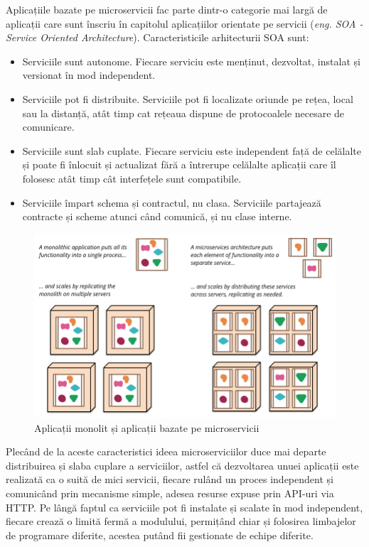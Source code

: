 \documentclass[12pt, a4paper, oneside, romanian]{teza-upb}
\begin{document}
Aplicațiile bazate pe microservicii fac parte dintr-o categorie mai largă de aplicații care sunt înscriu în capitolul aplicațiilor orientate pe servicii (\textit{eng. SOA - Service Oriented Architecture}). Caracteristicile arhitecturii SOA sunt:
\begin{itemize}
 \item Serviciile sunt autonome. Fiecare serviciu este menținut, dezvoltat, instalat și versionat în mod independent.
 \item Serviciile pot fi distribuite. Serviciile pot fi localizate oriunde pe rețea, local sau la distanță, atât timp cat rețeaua dispune de protocoalele necesare de comunicare.
 \item Serviciile sunt slab cuplate. Fiecare serviciu este independent față de celălalte și poate fi înlocuit și actualizat fără a întrerupe celălalte aplicații care îl folosesc atât timp cât interfețele sunt compatibile.
 \item Serviciile împart schema și contractul, nu clasa. Serviciile partajează contracte și scheme atunci când comunică, și nu clase interne.
\end{itemize}

\begin{figure}[ht]
\centering
\includegraphics[scale=0.3]{img/sketch.png}
\caption{Aplicații monolit și aplicații bazate pe microservicii}
\label{fig:arhi_mono_micro}
\end{figure}

Plecând de la aceste caracteristici ideea microserviciilor duce mai departe distribuirea și slaba cuplare a serviciilor, astfel că dezvoltarea unuei aplicații este realizată ca o suită de mici servicii, fiecare rulând un proces independent și comunicând prin mecanisme simple, adesea resurse expuse prin API-uri via HTTP. Pe lângă faptul ca serviciile pot fi instalate și scalate în mod independent, fiecare crează o limită fermă a modulului, permițând chiar și folosirea limbajelor de programare diferite, acestea putând fii gestionate de echipe diferite.
\end{document}

